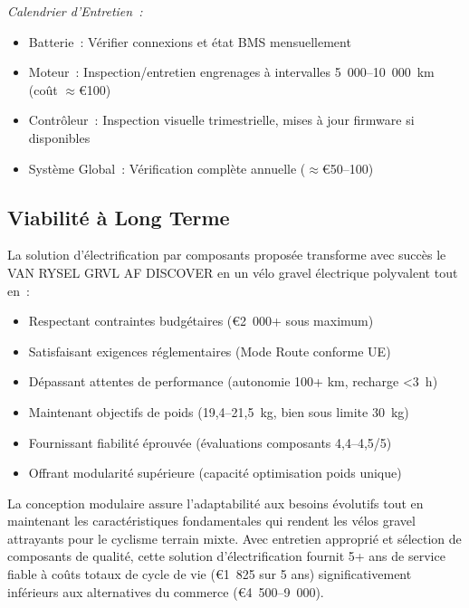 \documentclass[12pt,a4paper]{article}
\begin{document}
\textit{Calendrier d'Entretien~:}
\begin{itemize}
    \item Batterie~: Vérifier connexions et état BMS mensuellement
    \item Moteur~: Inspection/entretien engrenages à intervalles 5~000--10~000~km (coût $\approx$€100)
    \item Contrôleur~: Inspection visuelle trimestrielle, mises à jour firmware si disponibles
    \item Système Global~: Vérification complète annuelle ($\approx$€50--100)
\end{itemize}

\subsection{Viabilité à Long Terme}

La solution d'électrification par composants proposée transforme avec succès le VAN RYSEL GRVL AF DISCOVER en un vélo gravel électrique polyvalent tout en~:
\begin{itemize}
    \item Respectant contraintes budgétaires (€2~000+ sous maximum)
    \item Satisfaisant exigences réglementaires (Mode Route conforme UE)
    \item Dépassant attentes de performance (autonomie 100+ km, recharge <3~h)
    \item Maintenant objectifs de poids (19,4--21,5~kg, bien sous limite 30~kg)
    \item Fournissant fiabilité éprouvée (évaluations composants 4,4--4,5/5)
    \item Offrant modularité supérieure (capacité optimisation poids unique)
\end{itemize}

La conception modulaire assure l'adaptabilité aux besoins évolutifs tout en maintenant les caractéristiques fondamentales qui rendent les vélos gravel attrayants pour le cyclisme terrain mixte. Avec entretien approprié et sélection de composants de qualité, cette solution d'électrification fournit 5+ ans de service fiable à coûts totaux de cycle de vie (€1~825 sur 5 ans) significativement inférieurs aux alternatives du commerce (€4~500--9~000).
\end{document}

